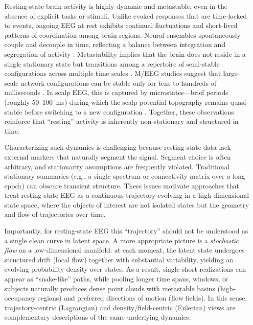 \documentclass[5p,twocolumn,authoryear]{elsarticle}
\begin{document}
Resting-state brain activity is highly dynamic and metastable, even in the absence of explicit tasks or stimuli. Unlike evoked responses that are time-locked to events, ongoing EEG at rest exhibits continual fluctuations and short-lived patterns of coordination among brain regions. Neural ensembles spontaneously couple and decouple in time, reflecting a balance between integration and segregation of activity \citep{TognoliKelso2014}. Metastability implies that the brain does not reside in a single stationary state but transitions among a repertoire of semi-stable configurations across multiple time scales \citep{Rabinovich2008,TognoliKelso2014}. M/EEG studies suggest that large-scale network configurations can be stable only for tens to hundreds of milliseconds \citep{Baker2014,Vidaurre2018}. In scalp EEG, this is captured by microstates---brief periods (roughly 50--100~ms) during which the scalp potential topography remains quasi-stable before switching to a new configuration \citep{Michel2018}. Together, these observations reinforce that ``resting'' activity is inherently non-stationary and structured in time.

Characterizing such dynamics is challenging because resting-state data lack external markers that naturally segment the signal. Segment choice is often arbitrary, and stationarity assumptions are frequently violated. Traditional stationary summaries (e.g., a single spectrum or connectivity matrix over a long epoch) can obscure transient structure. These issues motivate approaches that treat resting-state EEG as a continuous trajectory evolving in a high-dimensional state space, where the objects of interest are not isolated states but the geometry and flow of trajectories over time.

Importantly, for resting-state EEG this ``trajectory'' should not be understood as a single clean curve in latent space. A more appropriate picture is a \emph{stochastic flow} on a low-dimensional manifold: at each moment, the latent state undergoes structured drift (local flow) together with substantial variability, yielding an evolving probability density over states. As a result, single short realizations can appear as ``snake-like'' paths, while pooling longer time spans, windows, or subjects naturally produces dense point clouds with metastable basins (high-occupancy regions) and preferred directions of motion (flow fields). In this sense, trajectory-centric (Lagrangian) and density/field-centric (Eulerian) views are complementary descriptions of the same underlying dynamics.
\end{document}
